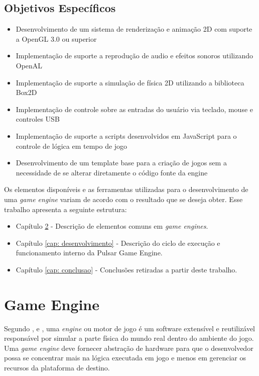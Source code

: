 \documentclass[12pt,	openright, twoside,	a4paper, english, french, spanish, brazil]{abntex2}
\begin{document}
\section{Objetivos Específicos}
\begin{itemize}
\item Desenvolvimento de um sistema de renderização e animação 2D com suporte a OpenGL 3.0 ou superior
\item Implementação de suporte a reprodução de audio e efeitos sonoros utilizando OpenAL
\item Implementação de suporte a simulação de física 2D utilizando a biblioteca Box2D
\item Implementação de controle sobre as entradas do usuário via teclado, mouse e controles USB
\item Implementação de suporte a scripts desenvolvidos em JavaScript para o controle de lógica em tempo de jogo
\item Desenvolvimento de um template base para a criação de jogos sem a necessidade de se alterar diretamente o código fonte da engine
\end{itemize}

Os elementos disponíveis e as ferramentas utilizadas para o desenvolvimento de uma \textit{game engine} variam de acordo com o resultado que se deseja obter. 
Esse trabalho apresenta a seguinte estrutura:

\begin{itemize}
\item Capítulo \ref{cap: gameEngine} - Descrição de elementos comuns em \textit{game engines}.
\item Capítulo \ref{cap: desenvolvimento} - Descrição do ciclo de execução e funcionamento interno da Pulsar Game Engine.
\item Capítulo \ref{cap: conclusao} - Conclusões retiradas a partir deste trabalho.
\end{itemize}

%
%

\chapter{Game Engine} \label{cap: gameEngine}

%
%

Segundo ,  e , uma \textit{engine} ou motor de jogo é um software extensível e reutilizável responsável por simular a parte física do mundo real dentro do ambiente do jogo. Uma \textit{game engine} deve fornecer abstração de hardware para que o desenvolvedor possa se concentrar mais na lógica executada em jogo e menos em gerenciar os recursos da plataforma de destino.
\end{document}
